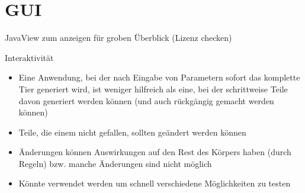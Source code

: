 \section{GUI}

JavaView zum anzeigen für groben Überblick (Lizenz checken)

% 
%   
% 
%   

Interaktivität

\begin{itemize}
 \item Eine Anwendung, bei der nach Eingabe von Parametern sofort das komplette Tier generiert wird, ist weniger hilfreich als eine, bei der schrittweise Teile davon generiert werden können (und auch rückgängig gemacht werden können)
 \item Teile, die einem nicht gefallen, sollten geändert werden können
 \item Änderungen können Auswirkungen auf den Rest des Körpers haben (durch Regeln) bzw. manche Änderungen sind nicht möglich
 \item Könnte verwendet werden um schnell verschiedene Möglichkeiten zu testen
\end{itemize}
